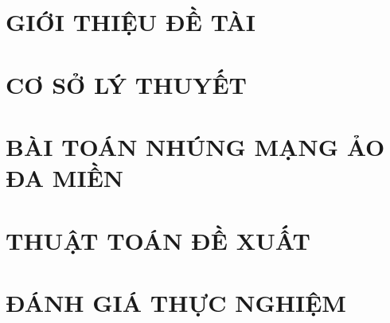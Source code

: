 \documentclass[a4paper,13pt,3p,twoside]{report}
\theoremstyle{definition}
\begin{document}
\renewcommand{\listtablename}{DANH MỤC BẢNG BIỂU}
{\let\oldnumberline\numberline
\renewcommand{\numberline}{Bảng~\oldnumberline}
\listoftables}

\glsaddall 
\renewcommand*{\acronymname}{DANH MỤC THUẬT NGỮ VÀ TỪ VIẾT TẮT}
\renewcommand*{\entryname}{Thuật ngữ}
\renewcommand*{\descriptionname}{Ý nghĩa}
\printnoidxglossaries

\renewcommand\appendixname{PHỤ LỤC}
\renewcommand\appendixpagename{PHỤ LỤC}
\renewcommand\appendixtocname{PHỤ LỤC}





\newpage
{}

\pagestyle{fancy}
\fancyhf{}
\fancyhead[RE, LO]{\leftmark}
\fancyfoot[RE, LO]{\thepage}

\chapter{GIỚI THIỆU ĐỀ TÀI}


\newpage
\chapter{CƠ SỞ LÝ THUYẾT}


\newpage
\chapter{BÀI TOÁN NHÚNG MẠNG ẢO ĐA MIỀN}


\newpage
\chapter{THUẬT TOÁN ĐỀ XUẤT}


\newpage
\chapter{ĐÁNH GIÁ THỰC NGHIỆM}

\end{document}
